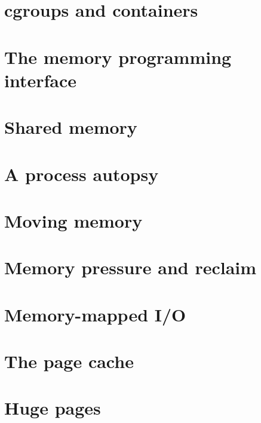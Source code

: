 \documentclass[a4paper,oneside]{scrbook}
\begin{document}


\chapter{cgroups and containers}



\chapter{The memory programming interface}



\chapter{Shared memory}



\chapter{A process autopsy}



\chapter{Moving memory}



\chapter{Memory pressure and reclaim}



\chapter{Memory-mapped I/O}



\chapter{The page cache}



\chapter{Huge pages}
\end{document}
